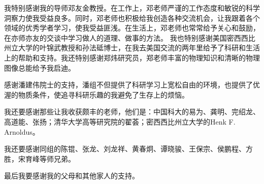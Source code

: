 
\begin{acknowledgements}

我特别感谢我的导师邓友金教授。在工作上，邓老师严谨的工作态度和敏锐的科学洞察力使我受益良多。同时，邓老师也积极给我创造各种交流机会，让我跟着各个领域的优秀学者学习，使我受益匪浅。在生活上，邓老师也常常给予关心和鼓励，在亦师亦友的交谈中学习做人的道理、做事的方法。
我也特别感谢美国密西西比州立大学的叶锦武教授和孙法砥博士，在我去美国交流的两年里给予了科研和生活上的帮助和支持。我还特别感谢郑炜研究员，郑老师丰富的物理知识和清晰的物理图像总能给予我启迪。

感谢潘建伟院士的支持，潘组不但提供了科研学习上宽松自由的环境，也提供了优渥的物质条件，使追寻科研乐趣的我避免了生存上的烦恼。

我还要感谢那些让我收获颇丰的老师，他们是：中国科大的易为、龚明、完绍龙、高道能、张扬；清华大学高等研究院的翟荟；密西西比州立大学的Henk F. Arnoldus。

我还要感谢同组的陈锟、张龙、刘龙祥、黄春炯、谭晓骏、王保宗、侯鹏程、方胜，宋育峰等师兄弟。

最后我要感谢我的父母和其他家人的支持。

\end{acknowledgements}